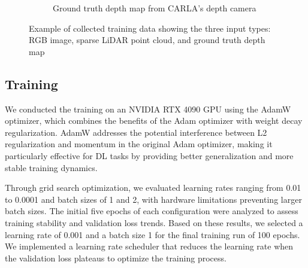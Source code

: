 \begin{figure}[h]
\begin{subfigure}{\textwidth}
        \caption{Ground truth depth map from CARLA's depth camera}
        \label{fig:depth_gt}
    \end{subfigure}
    \caption{Example of collected training data showing the three input types: RGB image, sparse LiDAR point cloud, and ground truth depth map}
    \label{fig:data_collection}
\end{figure}
\FloatBarrier

\subsection{Training}

We conducted the training on an NVIDIA RTX 4090 GPU using the AdamW optimizer, which combines the benefits of the Adam optimizer with weight decay regularization. AdamW addresses the potential interference between L2 regularization and momentum in the original Adam optimizer, making it particularly effective for \ac{DL} tasks by providing better generalization and more stable training dynamics.

Through grid search optimization, we evaluated learning rates ranging from 0.01 to 0.0001 and batch sizes of 1 and 2, with hardware limitations preventing larger batch sizes. The initial five epochs of each configuration were analyzed to assess training stability and validation loss trends. Based on these results, we selected a learning rate of 0.001 and a batch size 1 for the final training run of 100 epochs. We implemented a learning rate scheduler that reduces the learning rate when the validation loss plateaus to optimize the training process.

